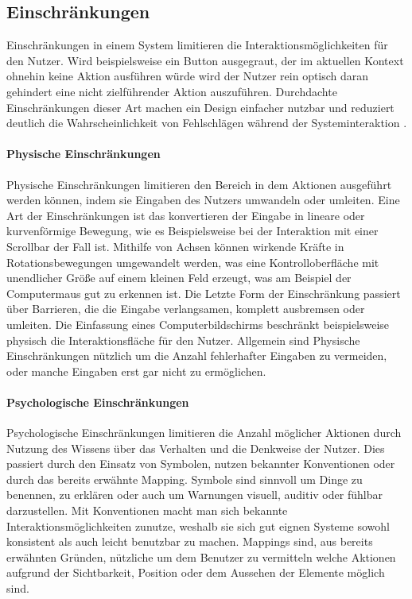 \subsection*{Einschränkungen}
Einschränkungen in einem System limitieren die Interaktionsmöglichkeiten für den Nutzer.
Wird beispielsweise ein Button ausgegraut, der im aktuellen Kontext ohnehin keine Aktion ausführen würde wird der Nutzer rein optisch daran gehindert eine nicht zielführender Aktion auszuführen.
Durchdachte Einschränkungen dieser Art machen ein Design einfacher nutzbar und reduziert deutlich die Wahrscheinlichkeit von Fehlschlägen während der Systeminteraktion \cite{Lidwell.2010}.

\paragraph{Physische Einschränkungen}
Physische Einschränkungen limitieren den Bereich in dem Aktionen ausgeführt werden können, indem sie Eingaben des Nutzers umwandeln oder umleiten.
Eine Art der Einschränkungen ist das konvertieren der Eingabe in lineare oder kurvenförmige Bewegung, wie es Beispielsweise bei der Interaktion mit einer Scrollbar der Fall ist.
Mithilfe von Achsen können wirkende Kräfte in Rotationsbewegungen umgewandelt werden, was eine Kontrolloberfläche mit unendlicher Größe auf einem kleinen Feld erzeugt, was am Beispiel der Computermaus gut zu erkennen ist.
Die Letzte Form der Einschränkung passiert über Barrieren, die die Eingabe verlangsamen, komplett ausbremsen oder umleiten. Die Einfassung eines Computerbildschirms beschränkt beispielsweise physisch die Interaktionsfläche für den Nutzer.
Allgemein sind Physische Einschränkungen nützlich um die Anzahl fehlerhafter Eingaben zu vermeiden, oder manche Eingaben erst gar nicht zu ermöglichen\cite{Norman.2016}.

\paragraph{Psychologische Einschränkungen}
Psychologische Einschränkungen limitieren die Anzahl möglicher Aktionen durch Nutzung des Wissens über das Verhalten und die Denkweise der Nutzer.
Dies passiert durch den Einsatz von Symbolen, nutzen bekannter Konventionen oder durch das bereits erwähnte Mapping.
Symbole sind sinnvoll um Dinge zu benennen, zu erklären oder auch um Warnungen visuell, auditiv oder fühlbar darzustellen.
Mit Konventionen macht man sich bekannte Interaktionsmöglichkeiten zunutze, weshalb sie sich gut eignen Systeme sowohl konsistent als auch leicht benutzbar zu machen.
Mappings sind, aus bereits erwähnten Gründen, nützliche um dem Benutzer zu vermitteln welche Aktionen aufgrund der Sichtbarkeit, Position oder dem Aussehen der Elemente möglich sind\cite{Norman.2016}.

